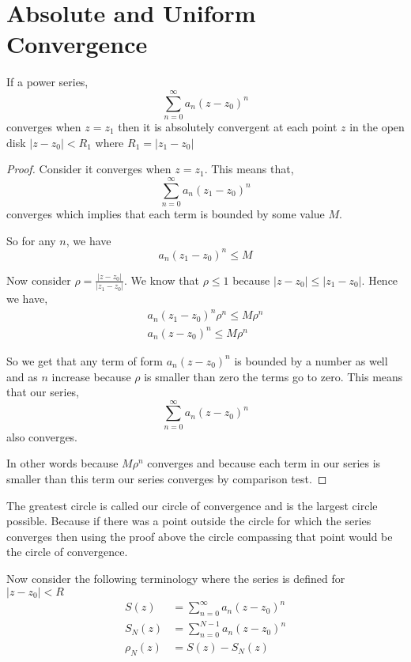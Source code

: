 
\section{Absolute and Uniform Convergence}

\begin{theorem}
   If a power series, 
   $$ \sum_{n=0}^{\infty} a_n (z - z_0)^{n} $$ 
   converges when $z = z_1$ then it is absolutely convergent at each point $z$ in the open disk $|z - z_0| < R_1$ where $R_1 = |z_1 - z_0|$
\end{theorem}
\begin{proof}
   Consider it converges when $z = z_1$. This means that, 
   $$ \sum_{n=0}^{\infty} a_n (z_1 - z_0)^{n} $$ converges which implies that each term is bounded by some value $M$.

   So for any $n$, we have 
   $$ a_n (z_1 - z_0)^{n} \le M $$ 

   Now consider $\rho = \frac{|z - z_0|}{|z_1 - z_0|}$. We know that $\rho \le 1$ because $|z - z_0| \le |z_1 - z_0|$. Hence we have, 
   \begin{align*}
   a_n(z_1 - z_0)^{n} \rho^{n} \le M \rho^{n}\\
   a_n(z - z_0)^{n} \le M \rho^{n}
   \end{align*}

   So we get that any term of form  $a_n (z - z_0)^{n}$ is bounded by a number as well and as $n$ increase because $\rho$ is smaller than zero the terms go to zero. This means that our series, 
   $$ \sum_{n=0}^{\infty} a_n (z - z_0)^{n} $$ also converges.

   In other words because $M\rho^{n}$ converges and because each term in our series is smaller than this term our series converges by comparison test.
\end{proof}
\begin{remark}
   The greatest circle is called our circle of convergence and is the largest circle possible. Because if there was a point outside the circle for which the series converges then using the proof above the circle compassing that point would be the circle of convergence.
\end{remark}

Now consider the following terminology where the series is defined for $|z - z_0| < R$
\begin{align*}
   S(z) &= \sum_{n=0}^{\infty} a_n(z - z_0)^{n}\\
   S_N(z) &= \sum_{n=0}^{N-1} a_n(z - z_0)^{n}\\
   \rho_N(z) &= S(z) - S_N(z)
\end{align*}

